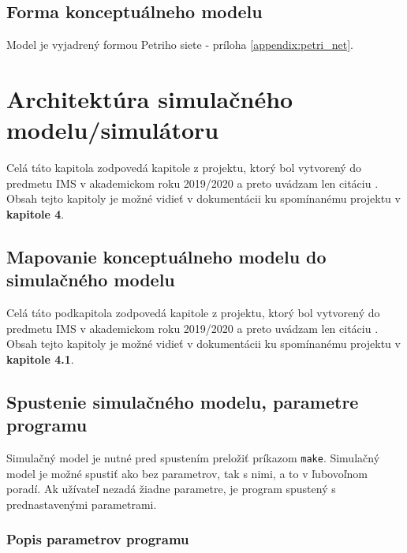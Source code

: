 \documentclass[a4paper, 11pt]{article}
\begin{document}
\subsection{Forma konceptuálneho modelu}

Model je vyjadrený formou Petriho siete - príloha \ref{appendix:petri_net}.

\pagebreak
\section{Architektúra simulačného modelu/simulátoru}

Celá táto kapitola zodpovedá kapitole z projektu, ktorý bol vytvorený do predmetu IMS v akademickom roku 2019/2020 a preto uvádzam len citáciu \cite{IMS_project}. Obsah tejto kapitoly je možné vidieť v dokumentácii \cite{IMS_doc} ku spomínanému projektu v \textbf{kapitole 4}.


\subsection{Mapovanie konceptuálneho modelu do simulačného modelu}

Celá táto podkapitola zodpovedá kapitole z projektu, ktorý bol vytvorený do predmetu IMS v akademickom roku 2019/2020 a preto uvádzam len citáciu \cite{IMS_project}. Obsah tejto kapitoly je možné vidieť v dokumentácii \cite{IMS_doc} ku spomínanému projektu v \textbf{kapitole 4.1}.


\subsection{Spustenie simulačného modelu, parametre programu}

Simulačný model je nutné pred spustením preložiť príkazom \texttt{make}. Simulačný model je možné spustiť ako bez parametrov, tak s nimi, a to v ľubovoľnom poradí. Ak užívateľ nezadá žiadne parametre, je program spustený s prednastavenými parametrami.

\subsubsection{Popis parametrov programu}
\end{document}
